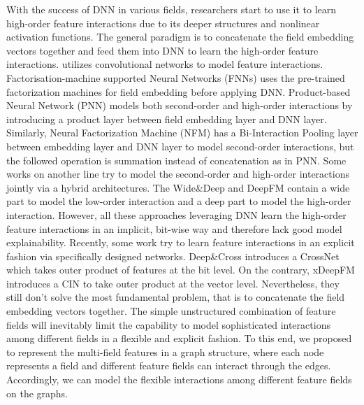 \documentclass[sigconf]{acmart}
\begin{document}
With the success of DNN in various fields, researchers start to use it to learn high-order feature interactions due to its deeper structures and nonlinear activation functions.
The general paradigm is to concatenate the field embedding vectors together and feed them into DNN to learn the high-order feature interactions.
\cite{liu2015convolutional} utilizes convolutional networks to model feature interactions. 
Factorisation-machine supported Neural Networks (FNNs) \cite{zhang2016deep} uses the pre-trained factorization machines for field embedding before applying DNN.
Product-based Neural Network (PNN) \cite{qu2016product} models both second-order and high-order interactions by introducing a product layer between field embedding layer and DNN layer.
Similarly, Neural Factorization Machine (NFM) \cite{he2017neural} has a Bi-Interaction Pooling layer between embedding layer and DNN layer to model second-order interactions, but the followed operation is summation instead of concatenation as in PNN. 
Some works on another line try to model the second-order and high-order interactions jointly via a hybrid architectures.
The Wide\&Deep \cite{cheng2016wide} and DeepFM \cite{guo2017deepfm} contain a wide part to model the low-order interaction and a deep part to model the high-order interaction.
However, all these approaches leveraging DNN learn the high-order feature interactions in an implicit, bit-wise way and therefore lack good model explainability. 
Recently, some work try to learn feature interactions in an explicit fashion via specifically designed networks. 
Deep\&Cross \cite{wang2017deep} introduces a CrossNet which takes outer product of features at the bit level.
On the contrary, xDeepFM \cite{lian2018xdeepfm} introduces a CIN to take outer product at the vector level.
Nevertheless, they still don't solve the most fundamental problem, that is to concatenate the field embedding vectors together.
The simple unstructured combination of feature fields will inevitably limit the capability to model sophisticated interactions among different fields in a flexible and explicit fashion.
To this end, we proposed to represent the multi-field features in a graph structure, where each node represents a field and different feature fields can interact through the edges.
Accordingly, we can model the flexible interactions among different feature fields on the graphs. 
 
\end{document}
